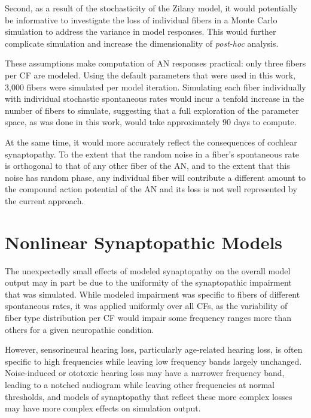 Second, as a result of the stochasticity of the Zilany model, it would potentially be informative to investigate the loss of individual fibers in a Monte Carlo simulation to address the variance in model responses.  This would further complicate simulation and increase the dimensionality of \emph{post-hoc} analysis. 

These assumptions make computation of AN responses practical: only three fibers per CF are modeled.  Using the default parameters that were used in this work, 3,000 fibers were simulated per model iteration.  Simulating each fiber individually with individual stochastic spontaneous rates would incur a tenfold increase in the number of fibers to simulate, suggesting that a full exploration of the parameter space, as was done in this work, would take approximately 90 days to compute.

At the same time, it would more accurately reflect the consequences of cochlear synaptopathy.  To the extent that the random noise in a fiber's spontaneous rate is orthogonal to that of any other fiber of the AN, and to the extent that this noise has random phase, any individual fiber will contribute a different amount to the compound action potential of the AN and its loss is not well represented by the current approach.  

\section{Nonlinear Synaptopathic Models} %
\label{sec:nonlinear_synaptopathic_models}
The unexpectedly small effects of modeled synaptopathy on the overall model output may in part be due to the uniformity of the synaptopathic impairment that was simulated.  While modeled impairment was specific to fibers of different spontaneous rates, it was applied uniformly over all CFs, as the variability of fiber type distribution per CF would impair some frequency ranges more than others for a given neuropathic condition. 

However, sensorineural hearing loss, particularly age-related hearing loss, is often specific to high frequencies while leaving low frequency bands largely unchanged.   Noise-induced or ototoxic hearing loss may have a narrower frequency band, leading to a notched audiogram while leaving other frequencies at normal thresholds, and models of synaptopathy that reflect these more complex losses may have more complex effects on simulation output.

